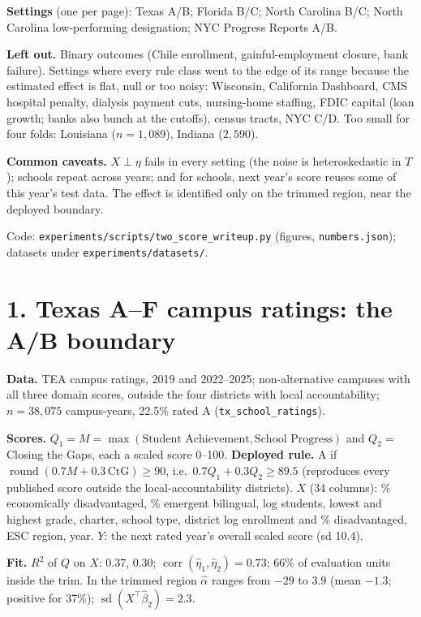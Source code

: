 \documentclass[10pt]{article}
\begin{document}
\textbf{Settings} (one per page): Texas A/B; Florida B/C; North Carolina B/C; North
Carolina low-performing designation; NYC Progress Reports A/B.

\textbf{Left out.} Binary outcomes (Chile enrollment, gainful-employment closure, bank
failure). Settings where every rule class went to the edge of its range because the
estimated effect is flat, null or too noisy: Wisconsin, California Dashboard, CMS hospital
penalty, dialysis payment cuts, nursing-home staffing, FDIC capital (loan growth; banks
also bunch at the cutoffs), census tracts, NYC C/D. Too small for four folds: Louisiana
($n=1{,}089$), Indiana ($2{,}590$).

\textbf{Common caveats.} $X\perp\eta$ fails in every setting (the noise is heteroskedastic
in $T$); schools repeat across years; and for schools, next year's score reuses some of
this year's test data. The effect is identified only on the trimmed region, near the
deployed boundary.

Code: \texttt{experiments/scripts/two\_score\_writeup.py} (figures, \texttt{numbers.json});
datasets under \texttt{experiments/datasets/}.

\newpage
\section*{1. Texas A--F campus ratings: the A/B boundary}

\textbf{Data.} TEA campus ratings, 2019 and 2022--2025; non-alternative campuses with all
three domain scores, outside the four districts with local accountability; $n=38{,}075$
campus-years, 22.5\% rated A (\texttt{tx\_school\_ratings}).

\textbf{Scores.} $Q_1=M=\max(\text{Student Achievement},\text{School Progress})$ and
$Q_2=$ Closing the Gaps, each a scaled score 0--100.
\textbf{Deployed rule.} A if $\operatorname{round}(0.7M+0.3\,\mathrm{CtG})\ge 90$, i.e.\
$0.7Q_1+0.3Q_2\ge 89.5$ (reproduces every published score outside the local-accountability
districts).
\textbf{$X$} (34 columns): \% economically disadvantaged, \% emergent bilingual, log
students, lowest and highest grade, charter, school type, district log enrollment and \%
disadvantaged, ESC region, year.
\textbf{$Y$}: the next rated year's overall scaled score (sd 10.4).

\textbf{Fit.} $R^2$ of $Q$ on $X$: 0.37, 0.30; $\operatorname{corr}(\hat\eta_1,\hat\eta_2)=0.73$;
66\% of evaluation units inside the trim. In the trimmed region $\hat\alpha$ ranges from
$-29$ to $3.9$ (mean $-1.3$; positive for 37\%); $\operatorname{sd}(X^\top\hat\beta_2)=2.3$.
\end{document}
